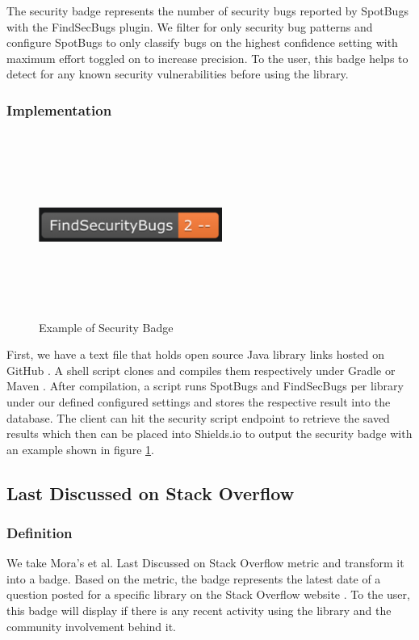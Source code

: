 \documentclass[12pt, letterpaper]{article}
\begin{document}
The security badge represents the number of security bugs reported by SpotBugs \cite{spotbugs} with the FindSecBugs \cite{findsecbugs} plugin.
We filter for only security bug patterns and configure SpotBugs to only classify bugs on the highest confidence setting
with maximum effort toggled on to increase precision. To the user, this badge helps to detect
for any known security vulnerabilities before using the library. 

\subsubsection{Implementation}

\begin{figure}[!htb]
    \centerline{
        \includegraphics[width=6cm,height=6cm,keepaspectratio=true]{findsecbugsbadge}
    }
    \caption{
        Example of Security Badge
    }
    \label{findsecbugsbadge}
\end{figure}

First, we have a text file that holds open source Java library links hosted on GitHub \cite{github}.
A shell script clones and compiles them respectively under Gradle \cite{gradle} or Maven \cite{maven}.
After compilation, a script runs SpotBugs and FindSecBugs per library under our defined configured settings
and stores the respective result
into the database. The client can hit the security script endpoint to retrieve the saved results which
then can be placed into Shields.io \cite{shields} to output the security badge with an example shown in figure \ref{findsecbugsbadge}. 


\subsection{Last Discussed on Stack Overflow}
\subsubsection{Definition}
We take Mora's et al. \cite{metrics} Last Discussed on Stack Overflow metric and transform it 
into a badge. Based on the metric, the badge represents the latest date of a question posted for a specific
library on the Stack Overflow website \cite{stackoverflow}.
To the user, this badge will display if there is any recent activity using the library and the community
involvement behind it.  
\end{document}
